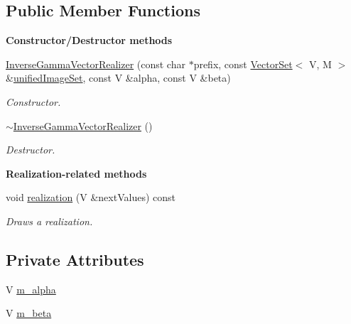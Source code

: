 \subsection*{Public Member Functions}
\begin{Indent}{\bf Constructor/\-Destructor methods}\par
\begin{DoxyCompactItemize}
\item 
\hyperlink{class_q_u_e_s_o_1_1_inverse_gamma_vector_realizer_ae179e3a7aa2b496f2b8b54904c8cb3d5}{Inverse\-Gamma\-Vector\-Realizer} (const char $\ast$prefix, const \hyperlink{class_q_u_e_s_o_1_1_vector_set}{Vector\-Set}$<$ V, M $>$ \&\hyperlink{class_q_u_e_s_o_1_1_base_vector_realizer_ad958991bab8d6369e8a0d66b22a237d4}{unified\-Image\-Set}, const V \&alpha, const V \&beta)
\begin{DoxyCompactList}\small\item\em Constructor. \end{DoxyCompactList}\item 
\hyperlink{class_q_u_e_s_o_1_1_inverse_gamma_vector_realizer_afb9611ce466dff4dac82b3b3efb3339e}{$\sim$\-Inverse\-Gamma\-Vector\-Realizer} ()
\begin{DoxyCompactList}\small\item\em Destructor. \end{DoxyCompactList}\end{DoxyCompactItemize}
\end{Indent}
\begin{Indent}{\bf Realization-\/related methods}\par
\begin{DoxyCompactItemize}
\item 
void \hyperlink{class_q_u_e_s_o_1_1_inverse_gamma_vector_realizer_a115670530398d012040f7183290251d3}{realization} (V \&next\-Values) const 
\begin{DoxyCompactList}\small\item\em Draws a realization. \end{DoxyCompactList}\end{DoxyCompactItemize}
\end{Indent}
\subsection*{Private Attributes}
\begin{DoxyCompactItemize}
\item 
V \hyperlink{class_q_u_e_s_o_1_1_inverse_gamma_vector_realizer_aeb864c46df7833d3723b0df787e283ab}{m\-\_\-alpha}
\item 
V \hyperlink{class_q_u_e_s_o_1_1_inverse_gamma_vector_realizer_a23a2409ad76d55ec0734b9755bea7997}{m\-\_\-beta}
\end{DoxyCompactItemize}
